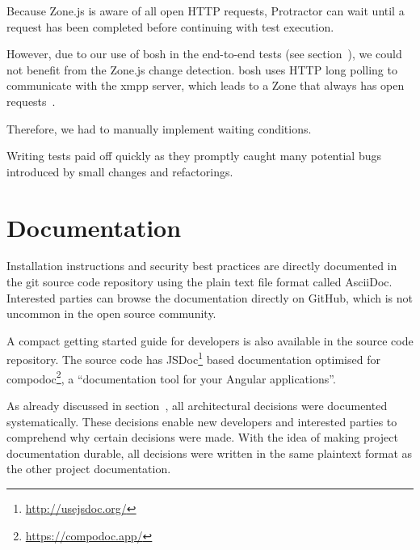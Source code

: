 Because Zone.js is aware of all open HTTP requests, Protractor can wait until a request has been completed before continuing with test execution.

However, due to our use of \gls{bosh} in the end-to-end tests (see section~), we could not benefit from the Zone.js change detection.
\gls{bosh} uses HTTP long polling to communicate with the \gls{xmpp} server, which leads to a Zone that always has open requests~\cite{xep-0124}.

Therefore, we had to manually implement waiting conditions.

Writing tests paid off quickly as they promptly caught many potential bugs introduced by small changes and refactorings.

\section{Documentation}

Installation instructions and security best practices are directly documented in the git source code repository using the plain text file format called AsciiDoc.
Interested parties can browse the documentation directly on GitHub, which is not uncommon in the open source community.

A compact getting started guide for developers is also available in the source code repository.
The source code has JSDoc\footnote{\url{http://usejsdoc.org/}} based documentation optimised for compodoc\footnote{\url{https://compodoc.app/}}, a ``documentation tool for your Angular applications''.

As already discussed in section~, all architectural decisions were documented systematically.
These decisions enable new developers and interested parties to comprehend why certain decisions were made.
With the idea of making project documentation durable, all decisions were written in the same plaintext format as the other project documentation.
